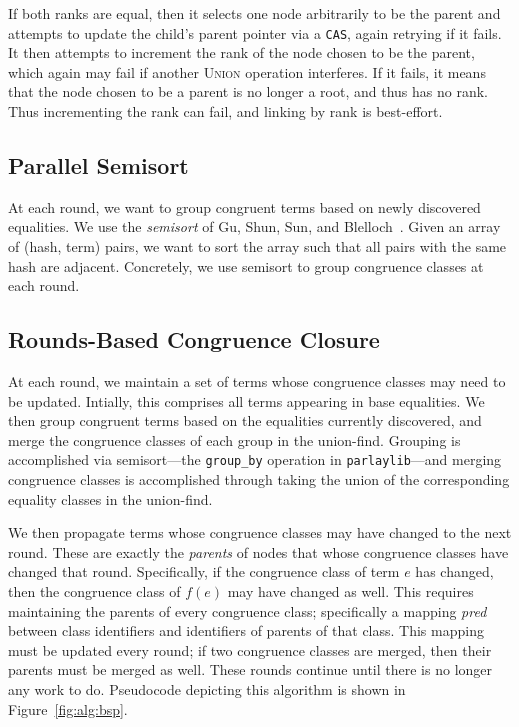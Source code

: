 If both ranks are equal, then it selects one node arbitrarily to be the parent
and attempts to update the child's parent pointer via a \texttt{CAS}, again
retrying if it fails. It then attempts to increment the rank of the node chosen
to be the parent, which again may fail if another \textsc{Union} operation
interferes. If it fails, it means that the node chosen to be a parent is no
longer a root, and thus has no rank. Thus incrementing the rank can fail, and
linking by rank is best-effort.

\subsection{Parallel Semisort}
\label{subsec:semisort}

At each round, we want to group congruent terms based on newly discovered
equalities. We use the \emph{semisort} of Gu, Shun, Sun, and
Blelloch~\cite{semisort}. Given an array of (hash, term) pairs, we want to sort
the array such that all pairs with the same hash are adjacent. Concretely, we
use semisort to group congruence classes at each round.

\subsection{Rounds-Based Congruence Closure}
\label{subsec:rounds}

At each round, we maintain a set of terms whose congruence classes may need to
be updated. Intially, this comprises all terms appearing in base equalities. We
then group congruent terms based on the equalities currently discovered, and
merge the congruence classes of each group in the union-find. Grouping is
accomplished via semisort---the \texttt{group\_by} operation in
\texttt{parlaylib}---and merging congruence classes is accomplished through
taking the union of the corresponding equality classes in the union-find.

We then propagate terms whose congruence classes may have changed to the next
round. These are exactly the \emph{parents} of nodes that whose congruence
classes have changed that round. Specifically, if the congruence class of term
$e$ has changed, then the congruence class of $f(e)$ may have changed as well.
This requires maintaining the parents of every congruence class; specifically a
mapping \textit{pred} between class identifiers and identifiers of parents of
that class. This mapping must be updated every round; if two congruence classes
are merged, then their parents must be merged as well. These rounds continue
until there is no longer any work to do. Pseudocode depicting this algorithm is
shown in Figure~\ref{fig:alg:bsp}.

